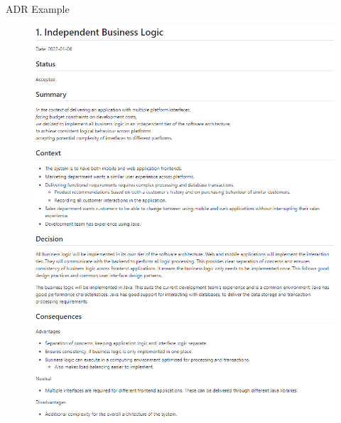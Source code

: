 \documentclass{slide}
\begin{document}
\begin{frame}{ADR Example}

\begin{figure}
    \href{https://github.com/CSSE6400/software-architecture/blob/main/notes/views/c4_model/adrs/0001-independent-business-logic.md}
            {\includegraphics[height=\textheight]{images/adr-example.png}}
\end{figure}

\end{frame}


\end{document}
